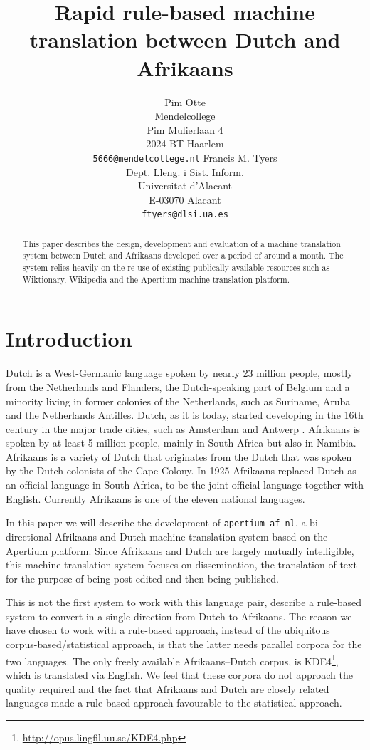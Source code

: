\documentclass[11pt]{article}
\title{Rapid rule-based machine translation between Dutch and Afrikaans}
\author{Pim Otte\\
  Mendelcollege\\
  Pim Mulierlaan 4\\
  2024 BT Haarlem\\
  {\tt 5666@mendelcollege.nl}  \And
  Francis M. Tyers\\
  Dept. Lleng. i Sist. Inform.\\
  Universitat d'Alacant\\
  E-03070 Alacant \\
  {\tt ftyers@dlsi.ua.es}}
\date{}
\begin{document}
\maketitle
\begin{abstract}
 This paper describes the design, development and evaluation of a machine
 translation system between Dutch and Afrikaans developed over a period of
 around a month. The system relies heavily on the re-use of existing 
 publically available resources such as Wiktionary, Wikipedia and the 
 Apertium machine translation platform.
\end{abstract}

\section{Introduction}

Dutch is a West-Germanic language spoken by nearly 23 million people, 
mostly from the Netherlands and Flanders, the Dutch-speaking part of Belgium and a minority 
living in former colonies of the Netherlands, such as Suriname, Aruba and the Netherlands 
Antilles. Dutch, as it is today, started developing in the 16th century in the 
major trade cities, such as Amsterdam and Antwerp \cite{Shetter:02}.  Afrikaans is spoken 
by at least 5 million people, mainly in South Africa but also in Namibia. Afrikaans is a 
variety of Dutch that originates from the Dutch that was spoken by the Dutch colonists of 
the Cape Colony. In 1925 Afrikaans replaced Dutch as an official language in South Africa, to 
be the joint official language together with English. \cite{Donaldson:93} Currently Afrikaans is one of the 
eleven national languages. 

In this paper we will describe the development of {\small {\tt apertium-af-nl}}, a bi-directional Afrikaans 
and Dutch machine-translation system based on the Apertium platform. Since Afrikaans and Dutch 
are largely mutually intelligible, this machine translation system focuses on dissemination, the 
translation of text for the purpose of being post-edited and then being published. 

This is not the first system to work with this language pair,  describe
a rule-based system to convert in a single direction from Dutch to Afrikaans. 
The reason we have chosen to work with a rule-based approach, instead of the ubiquitous 
corpus-based/statistical approach, is that the latter needs parallel corpora for the two 
languages. The only freely available Afrikaans--Dutch corpus, is 
KDE4\footnote{\url{http://opus.lingfil.uu.se/KDE4.php}}, which is translated via English. We 
feel that these corpora do not approach the quality required and the fact that Afrikaans 
and Dutch are closely related languages made a rule-based approach favourable to the 
statistical approach.
\end{document}
